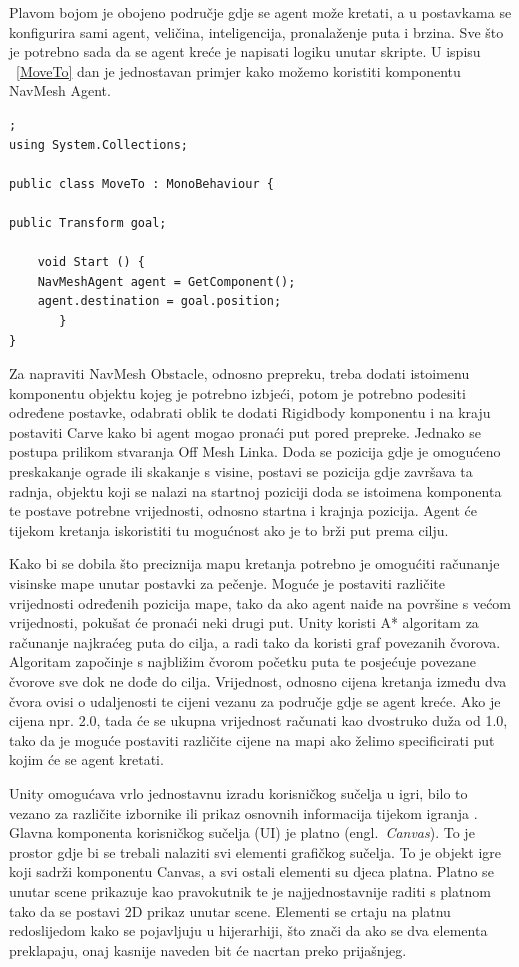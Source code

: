 Plavom bojom je obojeno područje gdje se agent može kretati, a u postavkama se konfigurira sami agent, veličina, inteligencija, pronalaženje puta i brzina. Sve što je potrebno sada da se agent kreće je napisati logiku unutar skripte. U ispisu ~\ref{MoveTo} dan je jednostavan primjer kako možemo koristiti komponentu NavMesh Agent. 
\begin{lstlisting}[caption={Korištenje navigacije}, label=MoveTo];
using System.Collections;
    
public class MoveTo : MonoBehaviour {
       
public Transform goal;
       
	void Start () {
	NavMeshAgent agent = GetComponent();
	agent.destination = goal.position; 
       }
}
\end{lstlisting}

Za napraviti NavMesh Obstacle, odnosno prepreku, treba dodati istoimenu komponentu objektu kojeg je potrebno izbjeći, potom je potrebno podesiti određene postavke, odabrati oblik te dodati Rigidbody komponentu i na kraju postaviti Carve kako bi agent mogao pronaći put pored prepreke. Jednako se postupa prilikom stvaranja Off Mesh Linka. Doda se pozicija gdje je omogućeno preskakanje ograde ili skakanje s visine, postavi se pozicija gdje završava ta radnja, objektu koji se nalazi na startnoj poziciji doda se istoimena komponenta te postave potrebne vrijednosti, odnosno startna i krajnja pozicija. Agent će tijekom kretanja iskoristiti tu mogućnost ako je to brži put prema cilju.

Kako bi se dobila što preciznija mapu kretanja potrebno je omogućiti računanje visinske mape unutar postavki za pečenje. Moguće je postaviti različite vrijednosti određenih pozicija mape, tako da ako agent naiđe na površine s većom vrijednosti, pokušat će pronaći neki drugi put. Unity koristi A* algoritam za računanje najkraćeg puta do cilja, a radi tako da koristi graf povezanih čvorova. Algoritam započinje s najbližim čvorom početku puta te posjećuje povezane čvorove sve dok ne dođe do cilja. Vrijednost, odnosno cijena kretanja između dva čvora ovisi o udaljenosti te cijeni vezanu za područje gdje se agent kreće. Ako je cijena npr. 2.0, tada će se ukupna vrijednost računati kao dvostruko duža od 1.0, tako da je moguće postaviti različite cijene na mapi ako želimo specificirati put kojim će se agent kretati.

Unity omogućava vrlo jednostavnu izradu korisničkog sučelja u igri, bilo to vezano za različite izbornike ili prikaz osnovnih informacija tijekom igranja
. 
Glavna komponenta korisničkog sučelja (UI) je platno (engl.~\textit{Canvas}). To je prostor gdje bi se trebali nalaziti svi elementi grafičkog sučelja. To je objekt igre koji sadrži komponentu Canvas, a svi ostali elementi su djeca platna. Platno se unutar scene prikazuje kao pravokutnik te je najjednostavnije raditi s platnom tako da se postavi 2D prikaz unutar scene. Elementi se crtaju na platnu redoslijedom kako se pojavljuju u hijerarhiji, što znači da ako se dva elementa preklapaju, onaj kasnije naveden bit će nacrtan preko prijašnjeg. 

